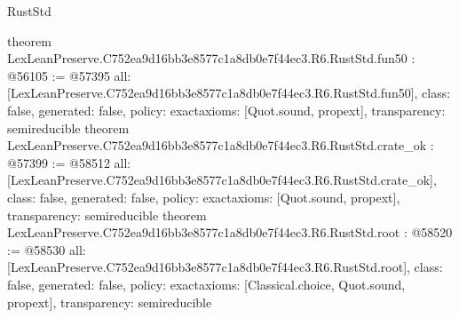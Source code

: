 \begin{lexlean}{RustStd}
\begin{coremodule}
{}
theorem LexLeanPreserve.C752ea9d16bb3e8577c1a8db0e7f44ec3.R6.RustStd.fun50 : @56105 := @57395 {
  all: [LexLeanPreserve.C752ea9d16bb3e8577c1a8db0e7f44ec3.R6.RustStd.fun50],
  class: false,
  generated: false,
  policy: exact{axioms: [Quot.sound, propext]},
  transparency: semireducible
}
theorem LexLeanPreserve.C752ea9d16bb3e8577c1a8db0e7f44ec3.R6.RustStd.crate_ok : @57399 := @58512 {
  all: [LexLeanPreserve.C752ea9d16bb3e8577c1a8db0e7f44ec3.R6.RustStd.crate_ok],
  class: false,
  generated: false,
  policy: exact{axioms: [Quot.sound, propext]},
  transparency: semireducible
}
theorem LexLeanPreserve.C752ea9d16bb3e8577c1a8db0e7f44ec3.R6.RustStd.root : @58520 := @58530 {
  all: [LexLeanPreserve.C752ea9d16bb3e8577c1a8db0e7f44ec3.R6.RustStd.root],
  class: false,
  generated: false,
  policy: exact{axioms: [Classical.choice, Quot.sound, propext]},
  transparency: semireducible
}


\end{coremodule}
\end{lexlean}
